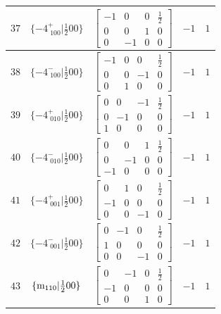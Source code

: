 \documentclass[fleqn,8pt]{jsarticle}
\begin{document}
\begin{longtable}{ccccc}
$ 37 $ & $ \{-4^{+}_{\,\,100}|\frac{1}{2} 0 0\} $ & $ \begin{bmatrix} -1 & 0 & 0 & \frac{1}{2} \\ 0 & 0 & 1 & 0 \\ 0 & -1 & 0 & 0 \end{bmatrix} $ & $ -1 $ & $ 1 $ \\ \hline
$ 38 $ & $ \{-4^{-}_{\,\,100}|\frac{1}{2} 0 0\} $ & $ \begin{bmatrix} -1 & 0 & 0 & \frac{1}{2} \\ 0 & 0 & -1 & 0 \\ 0 & 1 & 0 & 0 \end{bmatrix} $ & $ -1 $ & $ 1 $ \\ \hline
$ 39 $ & $ \{-4^{+}_{\,\,010}|\frac{1}{2} 0 0\} $ & $ \begin{bmatrix} 0 & 0 & -1 & \frac{1}{2} \\ 0 & -1 & 0 & 0 \\ 1 & 0 & 0 & 0 \end{bmatrix} $ & $ -1 $ & $ 1 $ \\ \hline
$ 40 $ & $ \{-4^{-}_{\,\,010}|\frac{1}{2} 0 0\} $ & $ \begin{bmatrix} 0 & 0 & 1 & \frac{1}{2} \\ 0 & -1 & 0 & 0 \\ -1 & 0 & 0 & 0 \end{bmatrix} $ & $ -1 $ & $ 1 $ \\ \hline
$ 41 $ & $ \{-4^{+}_{\,\,001}|\frac{1}{2} 0 0\} $ & $ \begin{bmatrix} 0 & 1 & 0 & \frac{1}{2} \\ -1 & 0 & 0 & 0 \\ 0 & 0 & -1 & 0 \end{bmatrix} $ & $ -1 $ & $ 1 $ \\ \hline
$ 42 $ & $ \{-4^{-}_{\,\,001}|\frac{1}{2} 0 0\} $ & $ \begin{bmatrix} 0 & -1 & 0 & \frac{1}{2} \\ 1 & 0 & 0 & 0 \\ 0 & 0 & -1 & 0 \end{bmatrix} $ & $ -1 $ & $ 1 $ \\ \hline
$ 43 $ & $ \{{\rm m}_{110}|\frac{1}{2} 0 0\} $ & $ \begin{bmatrix} 0 & -1 & 0 & \frac{1}{2} \\ -1 & 0 & 0 & 0 \\ 0 & 0 & 1 & 0 \end{bmatrix} $ & $ -1 $ & $ 1 $ \\ \hline

\end{longtable}
\end{document}
